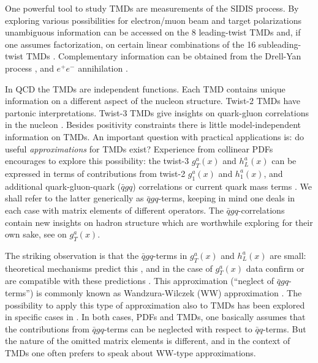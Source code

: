 \documentclass[a4paper,11pt]{article}
\begin{document}
One powerful tool to study TMDs are measurements of the SIDIS process.
By exploring various possibilities for electron/muon beam and target 
polarizations unambiguous information can be accessed on the 8 leading-twist 
TMDs \cite{Boer:1997nt} and, if one assumes factorization, on certain
linear combinations of the 16 subleading-twist TMDs 
\cite{Goeke:2005hb,Bacchetta:2006tn}.
Complementary information can be obtained 
from the Drell-Yan process \cite{Arnold:2008kf}, 
and $e^+e^-$ annihilation \cite{Metz:2016swz}.

In QCD the TMDs are independent functions. Each TMD contains unique
information on a different aspect of the nucleon structure. 
Twist-2 TMDs have partonic interpretations. Twist-3 TMDs 
give insights on quark-gluon correlations in the nucleon
\cite{Miller:2007ae,Burkardt:2007rv,Burkardt:2009rf}. 
Besides positivity constraints \cite{Bacchetta:1999kz} 
there is little model-independent information on TMDs. 
An important question with practical applications is:
do useful {\sl approximations} for TMDs exist? 
Experience from collinear PDFs encourages to explore this possibility: 
the twist-3 $g_T^a(x)$ and $h_L^a(x)$ can be expressed in terms of 
contributions from twist-2 $g_1^a(x)$ and $h_1^a(x)$, and additional 
quark-gluon-quark ($\bar{q}gq$) correlations or current quark mass 
terms \cite{Wandzura:1977qf,Jaffe:1991ra}. 
We shall refer to the latter generically as $\bar qgq$-terms, keeping in 
mind one deals in each case with matrix elements of different operators.
The $\bar qgq$-correlations contain new insights on hadron structure 
which are worthwhile exploring for their own sake, 
see \cite{Jaffe:1989xx} on $g_T^a(x)$.

The striking observation is that the $\bar qgq$-terms in $g_T^a(x)$ 
and $h_L^a(x)$ are small: theoretical mechanisms predict this 
\cite{Balla:1997hf,Dressler:1999hc,Gockeler:2000ja,Gockeler:2005vw}, 
and in the case of $g_T^a(x)$ data confirm or are compatible with these 
predictions \cite{Abe:1998wq,Anthony:2002hy}.
This approximation (``neglect of $\bar qgq$-terms'') is commonly 
known as Wandzura-Wilczek (WW) approximation \cite{Wandzura:1977qf}.
The possibility to apply this type of approximation also to TMDs has 
been explored in specific cases in \cite{Kotzinian:1995cz,Kotzinian:1997wt,
Kotzinian:2006dw,Avakian:2007mv,Metz:2008ib,Teckentrup:2009tk}.
In both cases, PDFs and TMDs, one basically assumes that the 
contributions from $\bar{q}gq$-terms can be neglected with respect to 
$\bar{q}q$-terms. But the nature of the omitted matrix elements is 
different, and in the context of TMDs one often prefers to speak 
about WW-type approximations.
\end{document}
